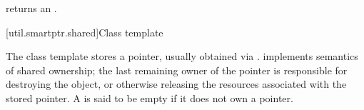 \begin{itemdescr}
\pnum\postconditions  {} returns an
 \ntbs{}.

\end{itemdescr}

[util.smartptr.shared]{Class template }

\pnum
{}%
The  class template stores a pointer, usually obtained
via .  implements semantics of shared ownership;
the last remaining owner of the pointer is responsible for destroying
the object, or otherwise releasing the resources associated with the stored pointer. A
 is said to be empty if it does not own a pointer.

